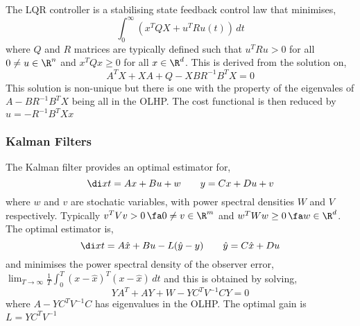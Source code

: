 The LQR controller is a stabilising state feedback control law that minimises,
$$ \int_0^\infty (x^TQX+u^TRu(t))\,dt$$
where $Q$ and $R$ matrices are typically defined such that $u^TRu>0$ for all $0 \ne u \in \R^n$ and $x^TQx \ge 0$ for all $x \in \R^d$. This is derived from the solution on,
$$ A^TX + XA + Q - XBR^{-1}B^TX = 0 $$
This solution is non-unique but there is one with the property of the eigenvales of $A - BR^{-1}B^TX$ being all in the OLHP. The cost functional is then reduced by $u = -R^{-1}B^TXx$\\

\subsubsection{Kalman Filters}

The Kalman filter provides an optimal estimator for,
$$ \di x t = Ax + Bu + w \qquad y = Cx + Du + v$$
where $w$ and $v$ are stochatic variables, with power spectral densities $W$ and $V$ respectively. Typically $v^TVv > 0 \, \fa 0 \ne v \in \R^m$ and $w^TWw \ge 0 \,\fa w \in \R^d$. The optimal estimator is,
$$ \di x t = A\hat x + Bu - L(\hat y - y) \qquad \hat y = C\hat x + Du $$
and minimises the power spectral density of the observer error, $\lim_{T\to\infty} \frac{1}{T}\int_0^T (x - \hat x)^T(x - \hat x)\,dt$ and this is obtained by solving,
$$ YA^T +AY+W-YC^TV^{-1}CY = 0 $$
where $A - YC^TV^{-1}C$ has eigenvalues in the OLHP. The optimal gain is $L = YC^TV^{-1}$
